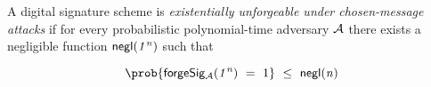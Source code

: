 \begin{definition}[$\cnstEUFCMA$]\label{def:aeufcma}
A digital signature scheme is \emph{existentially unforgeable under chosen-message attacks} if for every probabilistic polynomial-time adversary $\mathcal{A}$ there exists a negligible function $\mathsf{negl}(\mathit{1^n})$ such that 

\[ \prob{\procExpForgeSimple{\varSecParam} \opEqNoQ 1} \opSmEq \funNegl{\varN} \]

\begin{center}
    \fbox{
    \begin{varwidth}{\textwidth}
        \procedure[linenumbering]{$\procExpForgeSimple{\varSecParam}$} {
        \varKeyPair \opFunResult \procSetup{\varSecParam} \\
        (\varMsg^* \opSeperate \varSignature^*) \opFunResult \cnstAdversary^{\procSignOracle{\cdot}{\cdot}}(\varPubKey) \\
        \pcreturn ((\varMsg) \opNotIn \varSet \opAnd \funStar{\varSigAlice} \opNotEq \varSigAlice \opAnd \procVerf{\varMsg}{\varSigFin}{\varPubKeyAlice \opAddPoint \varPubKeyBob})
        }\\[2\baselineskip]
        \procedure[linenumbering]{$\procSignOracle{\varMsg}{\varPubKeyAlice}$} {
        \varSet \opAssign \cnstEmptySet \\
        \varSignature \opFunResult \procSign{\varSecKey}{\varMsg}\\
        \varSet \opAssign \varSet \opUnion \{\varMsg\} \\
        \pcreturn \varSignature
        }
    \end{varwidth}
    }
\end{center}
\end{definition}

